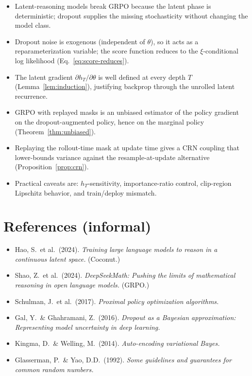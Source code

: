 \documentclass[11pt]{article}
\theoremstyle{definition}
\theoremstyle{remark}
\begin{document}
\begin{itemize}[topsep=2pt,itemsep=2pt]
\item Latent-reasoning models break GRPO because the latent phase is
      deterministic; dropout supplies the missing stochasticity without
      changing the model class.
\item Dropout noise is exogenous (independent of $\theta$), so it acts as a
      reparameterization variable; the score function reduces to the
      $\xi$-conditional log likelihood (Eq.~\ref{eq:score-reduces}).
\item The latent gradient $\partial h_T/\partial \theta$ is well defined at
      every depth $T$ (Lemma~\ref{lem:induction}), justifying backprop through
      the unrolled latent recurrence.
\item GRPO with replayed masks is an unbiased estimator of the policy
      gradient on the dropout-augmented policy, hence on the marginal
      policy (Theorem~\ref{thm:unbiased}).
\item Replaying the rollout-time mask at update time gives a CRN coupling
      that lower-bounds variance against the resample-at-update alternative
      (Proposition~\ref{prop:crn}).
\item Practical caveats are: $h_T$-sensitivity, importance-ratio control,
      clip-region Lipschitz behavior, and train/deploy mismatch.
\end{itemize}

\section*{References (informal)}

\begin{itemize}[topsep=2pt,itemsep=1pt,leftmargin=*]
\item Hao, S.\ et al.\ (2024). \emph{Training large language models to reason
      in a continuous latent space.}  (Coconut.)
\item Shao, Z.\ et al.\ (2024).  \emph{DeepSeekMath: Pushing the limits of
      mathematical reasoning in open language models.} (GRPO.)
\item Schulman, J.\ et al.\ (2017).  \emph{Proximal policy optimization
      algorithms.}
\item Gal, Y.\ \& Ghahramani, Z.\ (2016).  \emph{Dropout as a Bayesian
      approximation: Representing model uncertainty in deep learning.}
\item Kingma, D.\ \& Welling, M.\ (2014).  \emph{Auto-encoding variational
      Bayes.}
\item Glasserman, P.\ \& Yao, D.D.\ (1992).  \emph{Some guidelines and
      guarantees for common random numbers.}
\end{itemize}
\end{document}
